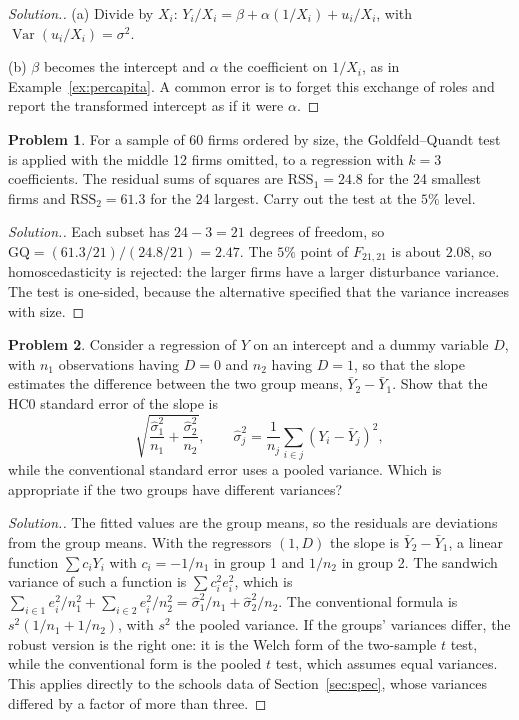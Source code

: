\documentclass[11pt,a4paper]{article}
\numberwithin{equation}{section}
\DeclareMathOperator{\Var}{Var}
\theoremstyle{definition}
\newtheorem{problemx}{Problem}[subsection]
\newenvironment{problem}{\begin{problemx}}{\end{problemx}}
\newenvironment{solution}
  {\renewcommand{\qedsymbol}{}\begin{proof}[\textit{Solution}.]}
  {\end{proof}}
\begin{document}
\begin{solution}
(a) Divide by $X_i$: $Y_i/X_i = \beta + \alpha(1/X_i) + u_i/X_i$, with $\Var(u_i/X_i) = \sigma^2$.

(b) $\beta$ becomes the intercept and $\alpha$ the coefficient on $1/X_i$, as in Example~\ref{ex:percapita}. A common error is to forget this exchange of roles and report
the transformed intercept as if it were $\alpha$.
\end{solution}

\begin{problem}
For a sample of 60 firms ordered by size, the Goldfeld--Quandt test is applied with the middle 12 firms omitted, to a regression with $k = 3$
coefficients. The residual sums of squares are $\text{RSS}_1 = 24.8$ for the 24 smallest firms and $\text{RSS}_2 = 61.3$ for the 24 largest. Carry out the test at the
$5\%$ level.
\end{problem}

\begin{solution}
Each subset has $24 - 3 = 21$ degrees of freedom, so $\text{GQ} = (61.3/21)/(24.8/21) = 2.47$. The $5\%$ point of $F_{21,21}$ is about $2.08$, so homoscedasticity is
rejected: the larger firms have a larger disturbance variance. The test is one-sided, because the alternative specified that the variance increases with
size.
\end{solution}

\begin{problem}
Consider a regression of $Y$ on an intercept and a dummy variable $D$, with $n_1$ observations having $D = 0$ and $n_2$ having $D = 1$, so that the slope estimates
the difference between the two group means, $\bar Y_2 - \bar Y_1$. Show that the HC0 standard error of the slope is
\[
\sqrt{\frac{\hat\sigma_1^2}{n_1} + \frac{\hat\sigma_2^2}{n_2}}, \qquad \hat\sigma_j^2 = \frac{1}{n_j}\sum_{i\in j}(Y_i - \bar Y_j)^2 ,
\]
while the conventional standard error uses a pooled variance. Which is appropriate if the two groups have different variances?
\end{problem}

\begin{solution}
The fitted values are the group means, so the residuals are deviations from the group means. With the regressors $(1, D)$ the slope is $\bar Y_2 - \bar Y_1$, a
linear function $\sum c_iY_i$ with $c_i = -1/n_1$ in group 1 and $1/n_2$ in group 2. The sandwich variance of such a function is $\sum c_i^2e_i^2$, which is
$\sum_{i\in1}e_i^2/n_1^2 + \sum_{i\in2}e_i^2/n_2^2 = \hat\sigma_1^2/n_1 + \hat\sigma_2^2/n_2$. The conventional formula is $s^2(1/n_1 + 1/n_2)$, with $s^2$ the pooled variance. If the
groups' variances differ, the robust version is the right one: it is the Welch form of the two-sample $t$ test, while the conventional form is the pooled $t$
test, which assumes equal variances. This applies directly to the schools data of Section~\ref{sec:spec}, whose variances differed by a factor of more than three.
\end{solution}
\end{document}
